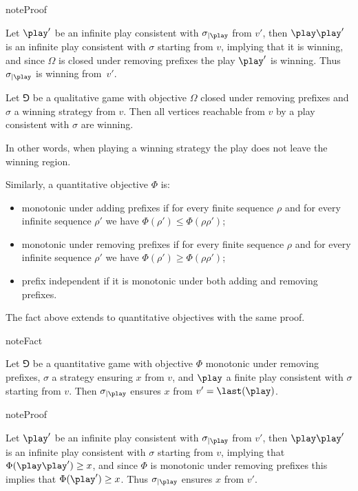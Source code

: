\documentclass[letterpaper,10pt,english]{sphinxmanual}
\begin{document}
\begin{sphinxadmonition}{note}{Proof}

Let \(\play'\) be an infinite play consistent with
\(\sigma_{\mid \play}\) from \(v'\), then \(\play \play'\) is an infinite play
consistent with \(\sigma\) starting from \(v\), implying that it is winning,
and since \(\Omega\) is closed under removing prefixes the play \(\play'\)
is winning. Thus \(\sigma_{\mid \play}\) is winning from \(v'\).
\end{sphinxadmonition}

Let \(\Game\) be a qualitative game with objective \(\Omega\) closed under
removing prefixes and \(\sigma\) a winning strategy from \(v\). Then all
vertices reachable from \(v\) by a play consistent with \(\sigma\) are
winning.

In other words, when playing a winning strategy the play does not leave
the winning region.

Similarly, a quantitative objective \(\Phi\) is:
\begin{itemize}
\item {} 
monotonic under adding prefixes if for every finite sequence
\(\rho\) and for every infinite sequence \(\rho'\) we have
\(\Phi(\rho') \le \Phi(\rho \rho')\);

\item {} 
monotonic under removing prefixes if for every finite
sequence \(\rho\) and for every infinite sequence \(\rho'\) we have
\(\Phi(\rho') \ge \Phi(\rho \rho')\);

\item {} 
prefix independent if it is monotonic under both adding and
removing prefixes.

\end{itemize}

The fact above extends to quantitative objectives with the same proof.

\begin{sphinxadmonition}{note}{Fact}

Let \(\Game\) be a
quantitative game with objective \(\Phi\) monotonic under removing
prefixes, \(\sigma\) a strategy ensuring \(x\) from \(v\), and \(\play\) a
finite play consistent with \(\sigma\) starting from \(v\). Then
\(\sigma_{\mid \play}\) ensures \(x\) from \(v' = \last(\play)\).
\end{sphinxadmonition}

\begin{sphinxadmonition}{note}{Proof}

Let \(\play'\) be an infinite play consistent with
\(\sigma_{\mid \play}\) from \(v'\), then \(\play \play'\) is an infinite play
consistent with \(\sigma\) starting from \(v\), implying that
\(\Phi(\play \play') \ge x\), and since \(\Phi\) is monotonic under removing
prefixes this implies that \(\Phi(\play') \ge x\). Thus
\(\sigma_{\mid \play}\) ensures \(x\) from \(v'\).
\end{sphinxadmonition}
\end{document}
